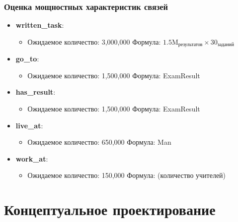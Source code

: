 \documentclass[a4paper]{article}
\begin{document}
\subsubsection{Оценка мощностных характеристик связей}
\begin{itemize}
      \item \textbf{written\_task}:
            \begin{itemize}
                  \item Ожидаемое количество: 3,000,000 \newline
                        Формула: $1.5\text{M}_{\text{результатов}} \times 30_{\text{заданий}}$
            \end{itemize}

      \item \textbf{go\_to}:
            \begin{itemize}
                  \item Ожидаемое количество: 1,500,000 \newline
                        Формула: ExamResult
            \end{itemize}

      \item \textbf{has\_result}:
            \begin{itemize}
                  \item Ожидаемое количество: 1,500,000 \newline
                        Формула: ExamResult
            \end{itemize}

      \item \textbf{live\_at}:
            \begin{itemize}
                  \item Ожидаемое количество: 650,000 \newline
                        Формула: Man
            \end{itemize}

      \item \textbf{work\_at}:
            \begin{itemize}
                  \item Ожидаемое количество: 150,000 \newline
                        Формула: (количество учителей)
            \end{itemize}
\end{itemize}

\section{Концептуальное проектирование}
\end{document}
